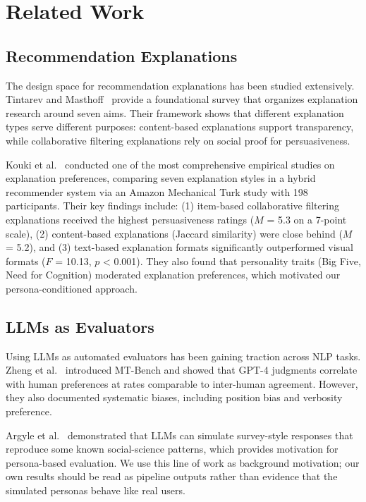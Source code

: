 \documentclass[sigconf,nonacm]{acmart}
\begin{document}
\section{Related Work}
\label{sec:related}

\subsection{Recommendation Explanations}

The design space for recommendation explanations has been studied extensively. Tintarev and Masthoff~\cite{tintarev2007survey} provide a foundational survey that organizes explanation research around seven aims. Their framework shows that different explanation types serve different purposes: content-based explanations support transparency, while collaborative filtering explanations rely on social proof for persuasiveness.

Kouki et al.~\cite{kouki2019} conducted one of the most comprehensive empirical studies on explanation preferences, comparing seven explanation styles in a hybrid recommender system via an Amazon Mechanical Turk study with 198 participants. Their key findings include: (1) item-based collaborative filtering explanations received the highest persuasiveness ratings ($M$ = 5.3 on a 7-point scale), (2) content-based explanations (Jaccard similarity) were close behind ($M$ = 5.2), and (3) text-based explanation formats significantly outperformed visual formats ($F$ = 10.13, $p$ < 0.001). They also found that personality traits (Big Five, Need for Cognition) moderated explanation preferences, which motivated our persona-conditioned approach.

\subsection{LLMs as Evaluators}

Using LLMs as automated evaluators has been gaining traction across NLP tasks. Zheng et al.~\cite{zheng2023judging} introduced MT-Bench and showed that GPT-4 judgments correlate with human preferences at rates comparable to inter-human agreement. However, they also documented systematic biases, including position bias and verbosity preference.

Argyle et al.~\cite{argyle2023} demonstrated that LLMs can simulate survey-style responses that reproduce some known social-science patterns, which provides motivation for persona-based evaluation. We use this line of work as background motivation; our own results should be read as pipeline outputs rather than evidence that the simulated personas behave like real users.
\end{document}
